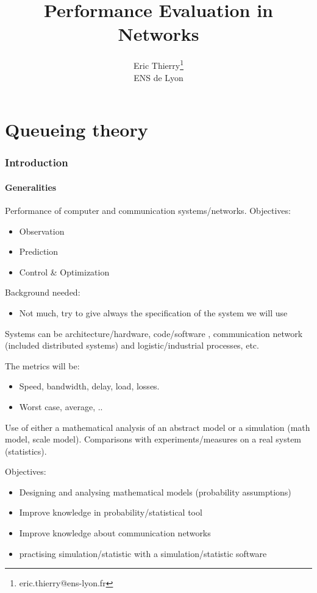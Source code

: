 \documentclass{article}
\title{Performance Evaluation in Networks}
\author{Eric Thierry\footnote{eric.thierry@ens-lyon.fr}\\
\small ENS de Lyon}
\date{}
\begin{document}
\maketitle

\tableofcontents
\newpage


\part{Queueing theory}
\section{Introduction}
\subsection{Generalities}

Performance of computer and communication systems/networks. Objectives:
\begin{itemize}
\item Observation
\item Prediction
\item Control \& Optimization
\end{itemize}

Background needed:
\begin{itemize}
\item Not much, try to give always the specification of the system we will use
\end{itemize}

Systems can be architecture/hardware, code/software
, communication network (included distributed systems) and logistic/industrial processes, etc.


\bigskip
The metrics will be:
\begin{itemize}
\item Speed, bandwidth, delay, load, losses.
\item Worst case, average, ..
\end{itemize}


\bigskip
Use of either a mathematical analysis of an abstract model or a simulation (math model, scale model). Comparisons with experiments/measures on a real system (statistics).


\bigskip
Objectives:
\begin{itemize}
\item Designing and analysing mathematical models (probability assumptions)
\item Improve knowledge in probability/statistical tool
\item Improve knowledge about communication networks
\item practising simulation/statistic with a simulation/statistic software
\end{itemize}
\end{document}
